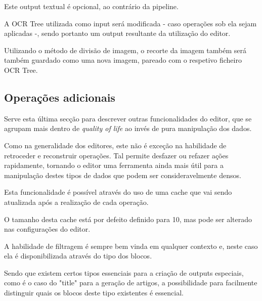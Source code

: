 
Este output textual é opcional, ao contrário da pipeline.

A OCR Tree utilizada como input será modificada - caso operações sob ela sejam aplicadas -, sendo portanto um output resultante da utilização do editor. 

Utilizando o método de divisão de imagem, o recorte da imagem também será também guardado como uma nova imagem, pareado com o respetivo ficheiro OCR Tree.



\subsection{Operações adicionais}

Serve esta última secção para descrever outras funcionalidades do editor, que se agrupam mais dentro de \textit{quality of life} ao invés de pura manipulação dos dados.


Como na generalidade dos editores, este não é exceção na habilidade de retroceder e reconstruir operações. Tal permite desfazer ou refazer ações rapidamente, tornando o editor uma ferramenta ainda mais útil para a manipulação destes tipos de dados que podem ser consideravelmente densos.


Esta funcionalidade é possível através do uso de uma cache que vai sendo atualizada após a realização de cada operação.

O tamanho desta cache está por defeito definido para 10, mas pode ser alterado nas configurações do editor.





A habilidade de filtragem é sempre bem vinda em qualquer contexto e, neste caso ela é disponibilizada através do tipo dos blocos.

Sendo que existem certos tipos essenciais para a criação de outputs especiais, como é o caso do "title" para a geração de artigos, a possibilidade para facilmente distinguir quais os blocos deste tipo existentes é essencial. 




